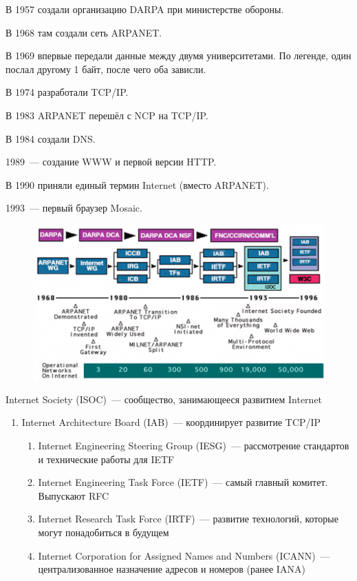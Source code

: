 
В 1957 создали организацию DARPA при министерстве обороны.

В 1968 там создали сеть ARPANET.

В 1969 впервые передали данные между двумя университетами. По легенде, один послал другому 1 байт, после чего оба зависли.

В 1974 разработали TCP/IP. 

В 1983 ARPANET перешёл с NCP на TCP/IP.

В 1984 создали DNS.

1989~--- создание WWW и первой версии HTTP.

В 1990 приняли единый термин Internet (вместо ARPANET).

1993~--- первый браузер Mosaic.


\begin{figure}[H]
  \centering
  \includegraphics[width=15cm]{images/00/02}
\end{figure}



Internet Society (ISOC)~--- сообщество, занимающееся развитием Internet
\begin{enumerate}
    \item Internet Architecture Board (IAB)~--- координирует развитие TCP/IP
    \begin{enumerate}
        \item Internet Engineering Steering Group (IESG)~--- рассмотрение стандартов и технические работы для IETF
        \item Internet Engineering Task Force (IETF)~--- самый главный комитет. Выпускают RFC
        \item Internet Research Task Force (IRTF)~--- развитие технологий, которые могут понадобиться в будущем
        \item Internet Corporation for Assigned Names and Numbers (ICANN)~--- централизованное назначение адресов и номеров (ранее IANA)
    \end{enumerate}
\end{enumerate}

